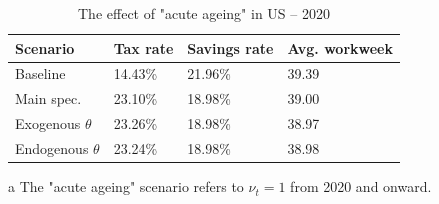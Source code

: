 \begin{table}[!htb]
\centering
\begin{threeparttable}
\caption{The effect of "acute ageing" in US -- 2020}
\label{table:US_ESC:ageing}
\renewcommand{\arraystretch}{1.25}
\begin{tabularx}{.9\textwidth}{lYYY}
\toprule
\textbf{Scenario} & \textbf{Tax rate} & \textbf{Savings rate} & \textbf{Avg. workweek}\\
\midrule 
Baseline & 14.43\% & 21.96\% & 39.39 \\
Main spec. & 23.10\% & 18.98\% & 39.00 \\
Exogenous $\theta$ & 23.26\% & 18.98\% & 38.97 \\
Endogenous $\theta$ & 23.24\% & 18.98\% & 38.98 \\
\bottomrule
\end{tabularx}

\begin{tablenotes}
\footnotesize \item [a] The "acute ageing" scenario refers to $\nu_t = 1$ from 2020 and onward.
\end{tablenotes}
\end{threeparttable}
\end{table}
